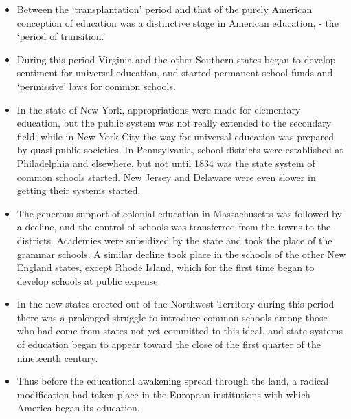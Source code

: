 \documentclass[]{book}
\providecommand{\tightlist}{%
  \setlength{\itemsep}{0pt}\setlength{\parskip}{0pt}}
\begin{document}
\begin{itemize}
\tightlist
\item
  Between the `transplantation' period and that of the purely American conception of education was a distinctive stage in American education, - the `period of transition.'
\item
  During this period Virginia and the other Southern states began to develop sentiment for universal education, and started permanent school funds and `permissive' laws for common schools.
\item
  In the state of New York, appropriations were made for elementary education, but the public system was not really extended to the secondary field; while in New York City the way for universal education was prepared by quasi-public societies. In Pennsylvania, school districts were established at Philadelphia and elsewhere, but not until 1834 was the state system of common schools started. New Jersey and Delaware were even slower in getting their systems started.
\item
  The generous support of colonial education in Massachusetts was followed by a decline, and the control of schools was transferred from the towns to the districts. Academies were subsidized by the state and took the place of the grammar schools. A similar decline took place in the schools of the other New England states, except Rhode Island, which for the first time began to develop schools at public expense.
\item
  In the new states erected out of the Northwest Territory during this period there was a prolonged struggle to introduce common schools among those who had come from states not yet committed to this ideal, and state systems of education began to appear toward the close of the first quarter of the nineteenth century.
\item
  Thus before the educational awakening spread through the land, a radical modification had taken place in the European institutions with which America began its education.
\end{itemize}
\end{document}
